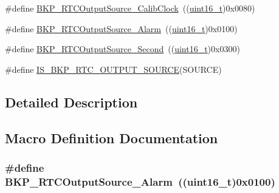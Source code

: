 \begin{DoxyCompactItemize}
\item 
\#define \hyperlink{group___r_t_c__output__source__to__output__on__the___tamper__pin_ga6fd7cb80bb52bca65641cbe6aa2c4590}{B\+K\+P\+\_\+\+R\+T\+C\+Output\+Source\+\_\+\+Calib\+Clock}~((\hyperlink{_p_e___types_8h_a1f1825b69244eb3ad2c7165ddc99c956}{uint16\+\_\+t})0x0080)
\item 
\#define \hyperlink{group___r_t_c__output__source__to__output__on__the___tamper__pin_gac016224386421d0cb1c0cd0ee201d65a}{B\+K\+P\+\_\+\+R\+T\+C\+Output\+Source\+\_\+\+Alarm}~((\hyperlink{_p_e___types_8h_a1f1825b69244eb3ad2c7165ddc99c956}{uint16\+\_\+t})0x0100)
\item 
\#define \hyperlink{group___r_t_c__output__source__to__output__on__the___tamper__pin_ga23cb72635820331317ee4ee5a7897a70}{B\+K\+P\+\_\+\+R\+T\+C\+Output\+Source\+\_\+\+Second}~((\hyperlink{_p_e___types_8h_a1f1825b69244eb3ad2c7165ddc99c956}{uint16\+\_\+t})0x0300)
\item 
\#define \hyperlink{group___r_t_c__output__source__to__output__on__the___tamper__pin_gac59454ee255feb55b5e14c34b70c99da}{I\+S\+\_\+\+B\+K\+P\+\_\+\+R\+T\+C\+\_\+\+O\+U\+T\+P\+U\+T\+\_\+\+S\+O\+U\+R\+CE}(S\+O\+U\+R\+CE)
\end{DoxyCompactItemize}


\subsection{Detailed Description}


\subsection{Macro Definition Documentation}
\subsubsection[{\texorpdfstring{B\+K\+P\+\_\+\+R\+T\+C\+Output\+Source\+\_\+\+Alarm}{BKP_RTCOutputSource_Alarm}}]{\setlength{\rightskip}{0pt plus 5cm}\#define B\+K\+P\+\_\+\+R\+T\+C\+Output\+Source\+\_\+\+Alarm~(({\bf uint16\+\_\+t})0x0100)}\hypertarget{group___r_t_c__output__source__to__output__on__the___tamper__pin_gac016224386421d0cb1c0cd0ee201d65a}{}\label{group___r_t_c__output__source__to__output__on__the___tamper__pin_gac016224386421d0cb1c0cd0ee201d65a}


